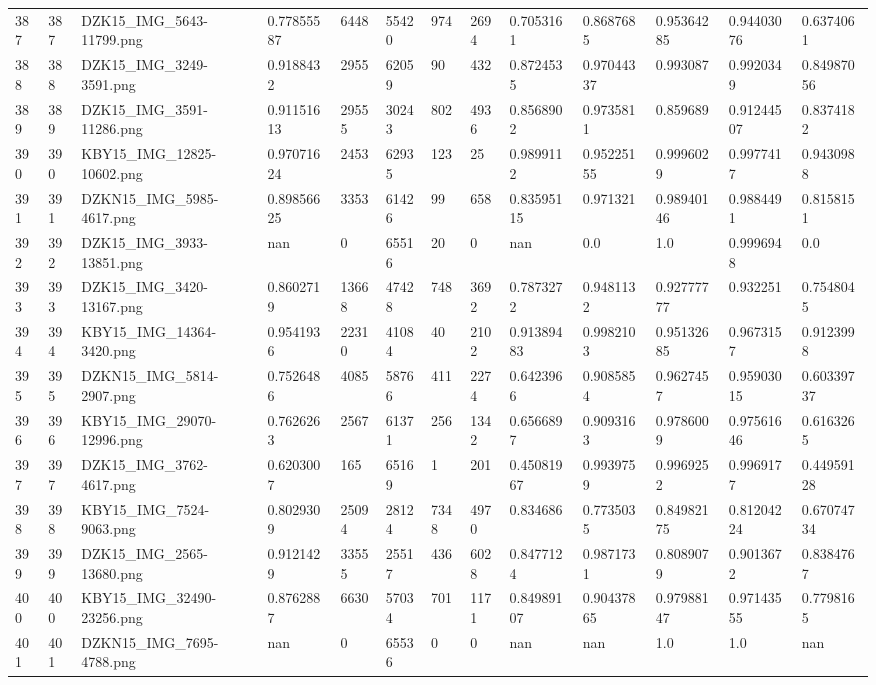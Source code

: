\documentclass[11pt, a4paper, twoside]{report}
\begin{document}
\begin{longtable}[c]{@{}lllllllllllll@{}}
387 & 387 & DZK15\_IMG\_5643-11799.png & 0.77855587 & 6448 & 55420 & 974 & 2694 & 0.7053161 & 0.8687685 & 0.95364285 & 0.94403076 & 0.6374061 \\
388 & 388 & DZK15\_IMG\_3249-3591.png & 0.9188432 & 2955 & 62059 & 90 & 432 & 0.8724535 & 0.97044337 & 0.993087 & 0.9920349 & 0.84987056 \\
389 & 389 & DZK15\_IMG\_3591-11286.png & 0.91151613 & 29555 & 30243 & 802 & 4936 & 0.8568902 & 0.9735811 & 0.859689 & 0.91244507 & 0.8374182 \\
390 & 390 & KBY15\_IMG\_12825-10602.png & 0.97071624 & 2453 & 62935 & 123 & 25 & 0.9899112 & 0.95225155 & 0.9996029 & 0.9977417 & 0.9430988 \\
391 & 391 & DZKN15\_IMG\_5985-4617.png & 0.89856625 & 3353 & 61426 & 99 & 658 & 0.83595115 & 0.971321 & 0.98940146 & 0.9884491 & 0.8158151 \\
392 & 392 & DZK15\_IMG\_3933-13851.png & nan & 0 & 65516 & 20 & 0 & nan & 0.0 & 1.0 & 0.9996948 & 0.0 \\
393 & 393 & DZK15\_IMG\_3420-13167.png & 0.8602719 & 13668 & 47428 & 748 & 3692 & 0.7873272 & 0.9481132 & 0.92777777 & 0.932251 & 0.7548045 \\
394 & 394 & KBY15\_IMG\_14364-3420.png & 0.9541936 & 22310 & 41084 & 40 & 2102 & 0.91389483 & 0.9982103 & 0.95132685 & 0.9673157 & 0.9123998 \\
395 & 395 & DZKN15\_IMG\_5814-2907.png & 0.7526486 & 4085 & 58766 & 411 & 2274 & 0.6423966 & 0.9085854 & 0.9627457 & 0.95903015 & 0.60339737 \\
396 & 396 & KBY15\_IMG\_29070-12996.png & 0.7626263 & 2567 & 61371 & 256 & 1342 & 0.6566897 & 0.9093163 & 0.9786009 & 0.97561646 & 0.6163265 \\
397 & 397 & DZK15\_IMG\_3762-4617.png & 0.6203007 & 165 & 65169 & 1 & 201 & 0.45081967 & 0.9939759 & 0.9969252 & 0.9969177 & 0.44959128 \\
398 & 398 & KBY15\_IMG\_7524-9063.png & 0.8029309 & 25094 & 28124 & 7348 & 4970 & 0.834686 & 0.7735035 & 0.84982175 & 0.81204224 & 0.67074734 \\
399 & 399 & DZK15\_IMG\_2565-13680.png & 0.9121429 & 33555 & 25517 & 436 & 6028 & 0.8477124 & 0.9871731 & 0.8089079 & 0.9013672 & 0.8384767 \\
400 & 400 & KBY15\_IMG\_32490-23256.png & 0.8762887 & 6630 & 57034 & 701 & 1171 & 0.84989107 & 0.90437865 & 0.97988147 & 0.97143555 & 0.7798165 \\
401 & 401 & DZKN15\_IMG\_7695-4788.png & nan & 0 & 65536 & 0 & 0 & nan & nan & 1.0 & 1.0 & nan \\

\end{longtable}
\end{document}
